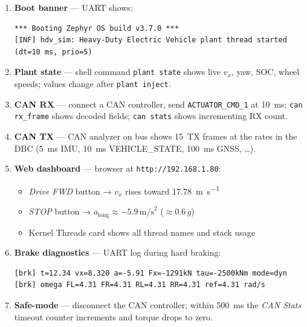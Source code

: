 \documentclass[11pt,a4paper]{article}
\begin{document}
\begin{enumerate}[leftmargin=*]
  \item \textbf{Boot banner} — UART shows:
    \begin{verbatim}
*** Booting Zephyr OS build v3.7.0 ***
[INF] hdv_sim: Heavy-Duty Electric Vehicle plant thread started (dt=10 ms, prio=5)
    \end{verbatim}

  \item \textbf{Plant state} — shell command \texttt{plant state} shows live
    $v_x$, yaw, SOC, wheel speeds; values change after \texttt{plant inject}.

  \item \textbf{CAN RX} — connect a CAN controller, send
    \texttt{ACTUATOR\_CMD\_1} at 10~ms; \texttt{can rx\_frame} shows decoded
    fields; \texttt{can stats} shows incrementing RX count.

  \item \textbf{CAN TX} — CAN analyzer on bus shows 15~TX frames at the
    rates in the DBC (5~ms IMU, 10~ms VEHICLE\_STATE, 100~ms GNSS, \ldots).

  \item \textbf{Web dashboard} — browser at \texttt{http://192.168.1.80}:
    \begin{itemize}[leftmargin=*]
      \item \emph{Drive FWD} button → $v_x$ rises toward \SI{17.78}{m.s^{-1}}
      \item \emph{STOP} button → $a_\text{long} \approx -5.9\,\text{m/s}^2$
            ($\approx 0.6\,g$)
      \item Kernel Threads card shows all thread names and stack usage
    \end{itemize}

  \item \textbf{Brake diagnostics} — UART log during hard braking:
    \begin{verbatim}
[brk] t=12.34 vx=8.320 a=-5.91 Fx=-1291kN tau=-2500kNm mode=dyn
[brk] omega FL=4.31 FR=4.31 RL=4.31 RR=4.31 ref=4.31 rad/s
    \end{verbatim}

  \item \textbf{Safe-mode} — disconnect the CAN controller; within 500~ms
    the \emph{CAN Stats} timeout counter increments and torque drops to zero.
\end{enumerate}

\end{document}
